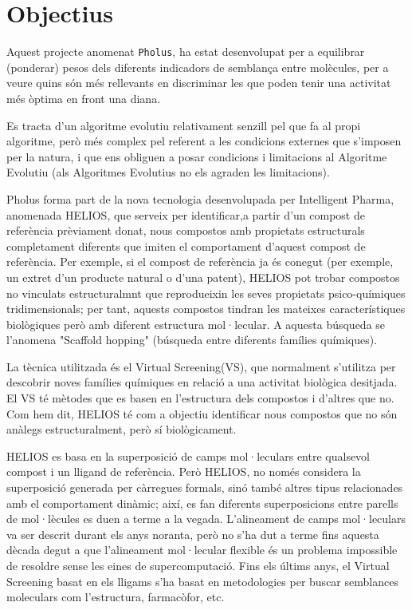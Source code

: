 \documentclass[titlepage,a4paper,12pt]{book}
\begin{document}
\tableofcontents  %
\section{Objectius} %
\label{sec:Objectius}
Aquest projecte anomenat \texttt{Pholus}, ha estat desenvolupat per a equilibrar
(ponderar) pesos dels diferents indicadors de semblança entre molècules, per a
veure quins són més rellevants en discriminar les que poden tenir una activitat
més òptima en front una diana. 

Es tracta d'un algoritme evolutiu relativament senzill pel que fa al propi algoritme, però més
complex pel referent a les condicions externes que s'imposen per la natura, i que ens obliguen a
posar condicions i limitacions al Algoritme Evolutiu (als Algoritmes Evolutius
no els agraden les limitacions).

Pholus forma part de la nova tecnologia desenvolupada per Intelligent Pharma, anomenada HELIOS, que
serveix per identificar,a partir d'un compost de referència prèviament donat, nous compostos amb
propietats estructurals completament diferents que imiten el comportament d'aquest compost de
referència. Per exemple, si el compost de referència ja és conegut (per exemple, un extret d'un
producte natural o d'una patent), HELIOS pot trobar compostos no  vinculats estructuralmnt que
reprodueixin les seves propietats psico-químiques tridimensionals; per tant, aquests compostos
tindran les mateixes característiques biològiques però amb diferent estructura mol·lecular. A
aquesta búsqueda se l'anomena "Scaffold hopping" (búsqueda entre diferents famílies químiques).

La tècnica utilitzada és el Virtual Screening(VS), que normalment s'utilitza per descobrir noves
famílies químiques en relació a una activitat biològica desitjada. El VS té mètodes que es basen en
l'estructura dels compostos i d'altres que no. Com hem dit, HELIOS té com a objectiu identificar
nous compostos que no són anàlegs estructuralment, però sí biològicament. 

HELIOS es basa en la superposició de camps mol·leculars entre qualsevol compost i un lligand de
referència. Però HELIOS, no només considera la superposició generada per càrregues formals, sinó
també altres tipus relacionades amb el comportament dinàmic; així, es fan diferents superposicions
entre parells de mol·lècules es duen a terme a la vegada. 
L'alineament de camps mol·leculars va ser descrit durant els anys noranta, però no s'ha dut a terme
fins aquesta dècada degut a que l'alineament mol·lecular flexible és un problema impossible de
resoldre sense les eines de supercomputació. Fins els últims anys, el Virtual Screening basat en els
lligams s'ha basat en metodologies per buscar semblances moleculars com l'estructura, farmacòfor,
etc. 
\end{document}
